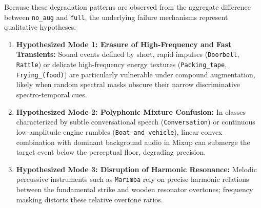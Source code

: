 \documentclass[11pt,a4paper]{article}
\begin{document}
Because these degradation patterns are observed from the aggregate difference between \texttt{no\_aug} and \texttt{full}, the underlying failure mechanisms represent qualitative hypotheses:
\begin{enumerate}
    \item \textbf{Hypothesized Mode 1: Erasure of High-Frequency and Fast Transients:} Sound events defined by short, rapid impulses (\texttt{Doorbell}, \texttt{Rattle}) or delicate high-frequency energy textures (\texttt{Packing\_tape}, \texttt{Frying\_(food)}) are particularly vulnerable under compound augmentation, likely when random spectral masks obscure their narrow discriminative spectro-temporal cues.
    \item \textbf{Hypothesized Mode 2: Polyphonic Mixture Confusion:} In classes characterized by subtle conversational speech (\texttt{Conversation}) or continuous low-amplitude engine rumbles (\texttt{Boat\_and\_vehicle}), linear convex combination with dominant background audio in Mixup can submerge the target event below the perceptual floor, degrading precision.
    \item \textbf{Hypothesized Mode 3: Disruption of Harmonic Resonance:} Melodic percussive instruments such as \texttt{Marimba} rely on precise harmonic relations between the fundamental strike and wooden resonator overtones; frequency masking distorts these relative overtone ratios.
\end{enumerate}
\end{document}
